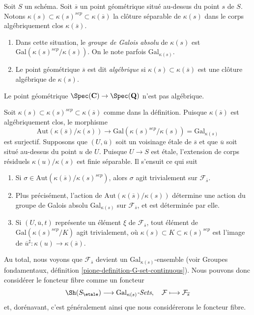\begin{definition}
\label{definition-algebraic-geometric-point}
Soit $S$ un sch\'ema.
Soit $\overline{s}$ un point g\'eom\'etrique situ\'e au-dessus du point $s$ de $S$.
Notons $\kappa(s) \subset \kappa(s)^{sep} \subset \kappa(\overline{s})$
la cl\^oture s\'eparable de $\kappa(s)$ dans le corps alg\'ebriquement
clos $\kappa(\overline{s})$.
\begin{enumerate}
\item Dans cette situation, le {\it groupe de Galois absolu} de $\kappa(s)$
est $\text{Gal}(\kappa(s)^{sep}/\kappa(s))$. On le note parfois
$\text{Gal}_{\kappa(s)}$.
\item Le point g\'eom\'etrique $\overline{s}$ est dit
{\it alg\'ebrique} si $\kappa(s) \subset \kappa(\overline{s})$ est
une cl\^oture alg\'ebrique de $\kappa(s)$.
\end{enumerate}
\end{definition}

\begin{example}
\label{example-stupid}
Le point g\'eom\'etrique
$\Spec(\mathbf{C}) \to \Spec(\mathbf{Q})$
n'est pas alg\'ebrique.
\end{example}

\noindent
Soit $\kappa(s) \subset \kappa(s)^{sep} \subset \kappa(\overline{s})$
comme dans la d\'efinition. Puisque $\kappa(\overline{s})$ est alg\'ebriquement
clos, le morphisme
$$
\text{Aut}(\kappa(\overline{s})/\kappa(s))
\longrightarrow
\text{Gal}(\kappa(s)^{sep}/\kappa(s)) = \text{Gal}_{\kappa(s)}
$$
est surjectif. Supposons que $(U, \overline{u})$ soit un
voisinage \'etale de $\overline{s}$ et que $\overline{u}$ soit situ\'e au-dessus
du point $u$ de $U$. Puisque $U \to S$ est \'etale, l'extension de corps r\'esiduels
$\kappa(u)/\kappa(s)$ est finie s\'eparable.
Il s'ensuit ce qui suit
\begin{enumerate}
\item Si $\sigma \in \text{Aut}(\kappa(\overline{s})/\kappa(s)^{sep})$,
alors $\sigma$ agit trivialement sur $\mathcal{F}_{\overline{s}}$.
\item Plus pr\'ecis\'ement, l'action de
$\text{Aut}(\kappa(\overline{s})/\kappa(s))$
d\'etermine une action du groupe de Galois absolu
$\text{Gal}_{\kappa(s)}$ sur $\mathcal{F}_{\overline{s}}$, et est d\'etermin\'ee par elle.
\item Si $(U, \overline{u}, t)$ repr\'esente un \'el\'ement $\xi$ de
$\mathcal{F}_{\overline{s}}$, tout \'el\'ement de
$\text{Gal}(\kappa(s)^{sep}/K)$ agit trivialement, o\`u
$\kappa(s) \subset K \subset \kappa(s)^{sep}$ est l'image de
$\overline{u}^\sharp : \kappa(u) \to \kappa(\overline{s})$.
\end{enumerate}
Au total, nous voyons que $\mathcal{F}_{\overline{s}}$ devient un
$\text{Gal}_{\kappa(s)}$-ensemble (voir
Groupes fondamentaux, d\'efinition \ref{pione-definition-G-set-continuous}).
Nous pouvons donc consid\'erer le foncteur fibre comme un foncteur
$$
\Sh(S_\etale) \longrightarrow
\text{Gal}_{\kappa(s)}\textit{-Sets},
\quad
\mathcal{F} \longmapsto \mathcal{F}_{\overline{s}}
$$
et, dor\'enavant, c'est g\'en\'eralement ainsi que nous consid\'ererons le foncteur fibre.

